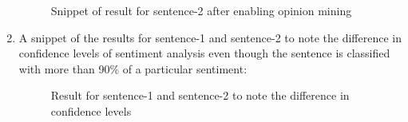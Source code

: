 \begin{enumerate}
\begin {figure}[h!h]
            \caption{Snippet of result for sentence-2 after enabling opinion mining}
            \label{opinionres}
        \end {figure}
    \item A snippet of the results for sentence-1 and sentence-2 to note the difference in confidence levels of sentiment analysis even though the sentence is classified with more than 90\% of a particular sentiment:
        \begin {figure}[h!h]
            \centering
            \caption{Result for sentence-1 and sentence-2 to note the difference in confidence levels}
            \label{saconfilevel}
        \end {figure}
        \begin {figure}[h!h]
            \centering

\end{figure}
\end{enumerate}
